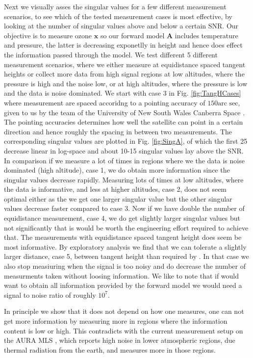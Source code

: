 Next we visually asses the singular values for a few different measurement scenarios, to see which of the tested measurement cases is most effective, by looking at the number of singular values above and below a certain SNR.
Our objective is to measure ozone $\bm{x}$ so our forward model $\bm{A}$ includes temperature and pressure, the latter is decreasing exponetlly in height and hence does effect the information passed through the model.
We test different 5  different measurement scenarios, where we either measure at equidistance spaced tangent heights or collect more data from high signal regions at low altitudes, where the pressure is high and the noise low, or at high altitudes, where the pressure is low and the data is noise dominated.
We start with case 3 in Fig. \ref{fig:TangHCases} where measurement are spaced accoridng to a pointing accuracy of $150\text{arc sec}$, given to us by the team of the University of New South Wales Canberra Space \cite{CubeSatInternal}.
The pointing accuracies determines how well the satellite can point in a certain direction and hence roughly the spacing in between two measurements.
The corresponding singular values are plotted in Fig. \ref{fig:SingA}, of which the first 25 decrease linear in log-space and about 10-15 singular values lay above the SNR.
In comparison if we measure a lot of times in regions where we the data is noise dominated (high altitude), case 1, we do obtain more information since the singular values decrease rapidly.
Measuring lots of times at low altitudes, where the data is informative, and less at higher altitudes, case 2, does not seem optimal either as the we get one larger singular value but the other singular values decrease faster compared to case 3.
Now if we have double the number of equidistance measurement, case 4, we do get slightly larger singular values but not significantly that is would be worth the engineering effort required to achieve that.
The measurements with equidistance spaced tangent height does seem be most informative.
By exploratory analysis we find that we can tolerate a slightly larger distance, case 5, between tangent height than required by \cite{CubeSatInternal}.
In that case we also stop measiuring when the signal is too noisy and do decrease the number of measurments taken without loosing information.
We like to note that if would want to obtain all information provided by the forward model we would need a signal to noise ratio of roughly $10^7$.

In principle we show that it does not depend on how one measures, one can not get more information by measuring more in regions where the information content is low or high.
This contradicts with the current measurement setup on the AURA MLS  \cite{livesey2006retrieval}, which reports high noise in lower atmospheric regions, due thermal radiation from the earth, and measures more in those regions.


